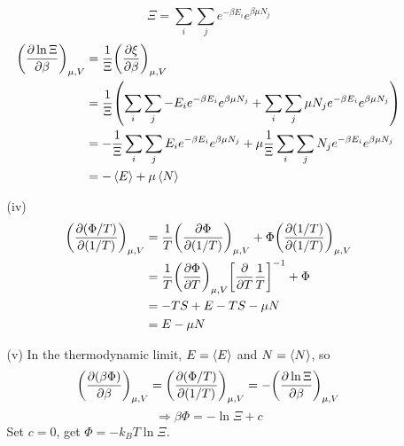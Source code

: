 \documentclass{article}
\begin{document}
\begin{enumerate}
\begin{enumerate}
            $$\Xi=\sum_i\sum_j e^{-\beta E_i}e^{\beta\mu N_j}$$
            \begin{align*}
                \qty(\pdv{\ln\Xi}{\beta})_{\mu,V}&=\frac{1}{\Xi}\qty(\pdv{\xi}{\beta})_{\mu,V}\\
                &=\frac{1}{\Xi}\qty(\sum_i\sum_j-E_ie^{-\beta E_i}e^{\beta\mu N_j}+\sum_i\sum_j\mu N_j e^{-\beta E_i}e^{\beta\mu N_j})\\
                &=-\frac{1}{\Xi}\sum_i\sum_j E_ie^{-\beta E_i}e^{\beta\mu N_j}+\mu\frac{1}{\Xi}\sum_i\sum_j N_j e^{-\beta E_i}e^{\beta\mu N_j}\\
                &=-\expval{E}+\mu\expval{N}
            \end{align*}
            \item[(iv)]
            \begin{align*}
                \qty(\pdv{(\Phi/T)}{(1/T)})_{\mu,V}&=\frac{1}{T}\qty(\pdv{\Phi}{(1/T)})_{\mu,V}+\Phi\qty(\pdv{(1/T)}{(1/T)})_{\mu,V}\\
                &=\frac{1}{T}\qty(\pdv{\Phi}{T})_{\mu,V}\qty[\pdv{T}\frac{1}{T}]^{-1}+\Phi\\
                &=-TS+E-TS-\mu N\\
                &=E-\mu N
            \end{align*}
            \item[(v)] In the thermodynamic limit, $E=\expval{E}$ and $N=\expval{N}$, so
            $$\qty(\pdv{(\beta\Phi)}{\beta})_{\mu,V}=\qty(\pdv{(\Phi/T)}{(1/T)})_{\mu,V}=-\qty(\pdv{\ln\Xi}{\beta})_{\mu,V}$$
            $$\Rightarrow \beta\Phi=-\ln\Xi+c$$
            Set $c=0$, get $\Phi=-k_B T\ln\Xi$.
        \end{enumerate}
    \end{enumerate}
\end{document}
